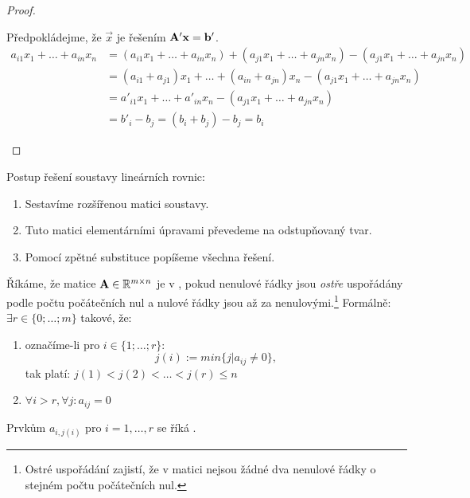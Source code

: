 \begin{proof}
\begin{enumerate}
            Předpokládejme, že $\vec{x}$ je řešením $\mathbf{A'}\mathbf{x} = \mathbf{b'}$.
            \begin{align*}
                a_{i1}x_1 + \dots + a_{in}x_n &= 
                                              (a_{i1}x_1 + \dots +
                a_{in}x_n) + (a_{j1}x_1 + \dots + a_{jn}x_n) 
                - (a_{j1}x_1 + \dots + a_{jn}x_n) \\
                &= (a_{i1} + a_{j1})x_1 + \dots + (a_{in} + a_{jn})x_n -
                (a_{j1}x_1 + \dots + a_{jn}x_n) \\
                &= a'_{i1}x_1 + \dots + a'_{in}x_n - (a_{j1}x_1 + \dots +
                a_{jn}x_n) \\
                &= b'_i - b_j = (b_i + b_j) - b_j = b_i
            \end{align*}
    \end{enumerate}
\end{proof}

Postup řešení soustavy lineárních rovnic:
\begin{enumerate}
    \item Sestavíme rozšířenou matici soustavy.
    \item Tuto matici elementárními úpravami převedeme na odstupňovaný tvar.
    \item Pomocí zpětné substituce popíšeme všechna řešení.
\end{enumerate}

\begin{definition}
    Říkáme, že matice $\mathbf{A} \in \mathbb{R}^{m \times n}$ je v
    , pokud nenulové řádky jsou \emph{ostře}
    uspořádány podle počtu počátečních nul a nulové řádky jsou 
    až za nenulovými.\footnote{Ostré uspořádání zajistí, že v matici nejsou 
    žádné dva nenulové řádky o stejném počtu počátečních nul.} Formálně: 
    $\exists r \in \{0; \dots; m\}$ takové, že:
    \begin{enumerate}
        \item označíme-li pro $i \in \{1; \dots; r\}$: 
            $$j(i) := min\{j|a_{ij} \neq 0\},$$ 
            tak platí: $j(1) < j(2) < \dots < j(r) \le n$
        \item $\forall i > r, \forall j: a_{ij} = 0$
    \end{enumerate}
    Prvkům $a_{i,j(i)}$ pro $i = 1, \dots, r$ se říká .
\end{definition}

